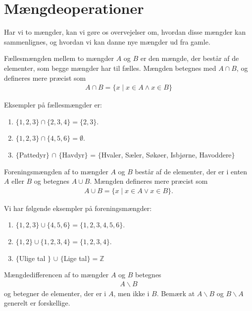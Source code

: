 \section*{Mængdeoperationer}
Har vi to mængder, kan vi gøre os overvejelser om, hvordan disse mængder kan sammenlignes, og hvordan vi kan danne nye mængder ud fra gamle. 

\begin{defn}[Fællesmængde]
	Fællesmængden mellem to mængder $A$ og $B$ er den mængde, der består af de elementer, som begge mængder har til fælles. Mængden betegnes med $A \cap B$, og defineres mere
	præcist som
	\begin{align*}
		A \cap B = \{x \mid x \in A \land x \in B\}
	\end{align*}
\end{defn}

\begin{exa}\label{exa:1}
	Eksempler på fællesmængder er:
	\begin{enumerate}[label=\roman*)]
		\item $\{1,2,3\} \cap \{2,3,4\} = \{2,3\}$.
		\item $\{1,2,3\} \cap \{4,5,6\} = \emptyset$.
	\item      $\{$Pattedyr$\}$ $\cap$ $\{$Havdyr$\}$ = $\{$Hvaler, Sæler, Søkøer, Isbjørne, Havoddere$\}$
	\end{enumerate}
\end{exa}

\begin{defn}[Foreningsmængde]
Foreningsmængden af to mængder $A$ og $B$ består af de elementer, der er i enten $A$ eller $B$ og betegnes $A \cup B$. Mængden defineres mere præcist som
\begin{align*}
	A \cup B = \{x \mid x \in A \lor x \in B\}.
\end{align*}
\end{defn}
\begin{exa}
Vi har følgende eksempler på foreningsmængder:
\begin{enumerate}[label=\roman*)]
\item $\{1,2,3\} \cup \{4,5,6\} = \{1,2,3,4,5,6\}$.
\item $\{1,2\} \cup \{1,2,3,4\} = \{1,2,3,4\}$.
\item $\{$Ulige tal $\}$ $\cup$ $\{$Lige tal$\}=\mathbb{Z}$ 
\end{enumerate}
\end{exa}
\begin{defn}
Mængdedifferencen af to mængder $A$ og $B$ betegnes
\begin{align*}
A \backslash B
\end{align*}
og betegner de elementer, der er i $A$, men ikke i $B$. Bemærk at $A\backslash B$ og $B \backslash A$ generelt er forskellige.
\end{defn}


